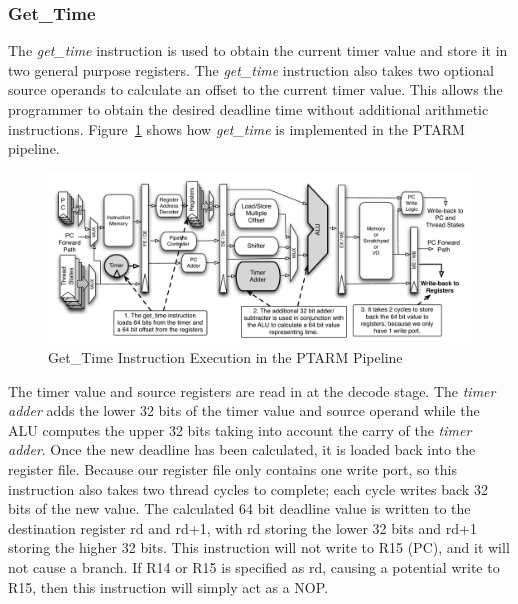 \subsubsection{Get\_Time}    
The \emph{get\_time} instruction is used to obtain the current timer value and store it in two general purpose registers.
The \emph{get\_time} instruction also takes two optional source operands to calculate an offset to the current timer value. 
This allows the programmer to obtain the desired deadline time without additional arithmetic instructions.
Figure~\ref{fig:get_time_pipeline_implementation} shows how \emph{get\_time} is implemented in the PTARM pipeline. 
\begin{figure}[h]
  \vspace{-15pt}
  \begin{center}
    \includegraphics[scale=.54]{figs/get_time_pipeline_implementation}
  \end{center}
  \vspace{-3mm}
  \caption{Get\_Time Instruction Execution in the PTARM Pipeline}
  \label{fig:get_time_pipeline_implementation}
\end{figure}

The timer value and source registers are read in at the decode stage. 
The \emph{timer adder} adds the lower 32 bits of the timer value and source operand while the ALU computes the upper 32 bits taking into account the carry of the \emph{timer adder}.
Once the new deadline has been calculated, it is loaded back into the register file. 
Because our register file only contains one write port, so this instruction also takes two thread cycles to complete; each cycle writes back 32 bits of the new value. 
The calculated 64 bit deadline value is written to the destination register rd and rd+1, with rd storing the lower 32 bits and rd+1 storing the higher 32 bits. 
This instruction will not write to R15 (PC), and it will not cause a branch. 
If R14 or R15 is specified as rd, causing a potential write to R15, then this instruction will simply act as a NOP.


